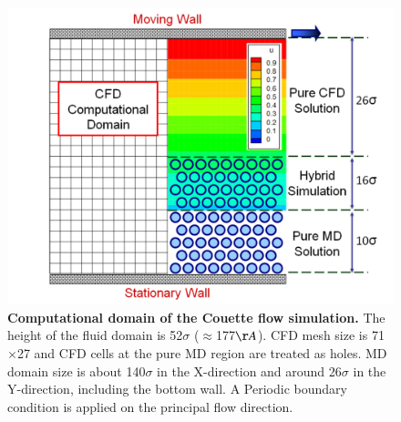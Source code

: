 \documentclass[preprint,12pt]{elsarticle}
\begin{document}


\begin{figure}
\centering
\includegraphics[width=0.8\linewidth]{Couette_Val_Domain.pdf}
\vskip-0.2cm
\caption{\small {\bf Computational domain of the Couette flow simulation.} The height of the fluid domain is 52$\sigma$ ($\approx$177$\AA$). CFD mesh size is 71$\times$27 and CFD cells at the pure MD region are treated as holes. MD domain size is about 140$\sigma$ in the X-direction and around 26$\sigma$ in the Y-direction, including the bottom wall. A Periodic boundary condition is applied on the principal flow direction.}

\label{Couette_Val_Domain}
\end{figure}
\end{document}
